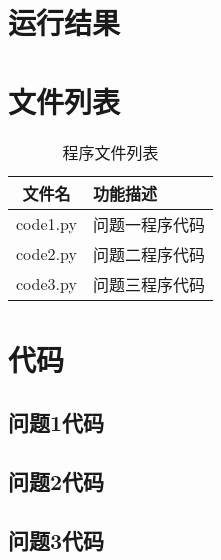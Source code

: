 \documentclass[withoutpreface,bwprint]{cumcmthesis} %
\begin{document}
\begin{appendices}

\section{运行结果}


\section{文件列表}
\begin{table}[H]
    \caption{程序文件列表}
    \centering
    \begin{tabularx}{0.85\textwidth}{c l}
        \bottomrule[1.5pt]
        文件名 & 功能描述 \\
        \midrule[1pt]
        code1.py & 问题一程序代码 \\
        code2.py & 问题二程序代码 \\
        code3.py & 问题三程序代码 \\
        \bottomrule[1.5pt]
    \end{tabularx}
    \label{tab:文件列表}
\end{table}

\section{代码}
\subsection{问题1代码}
% 

\subsection{问题2代码}
% 

\subsection{问题3代码}
% 

\end{appendices}
\end{document}
